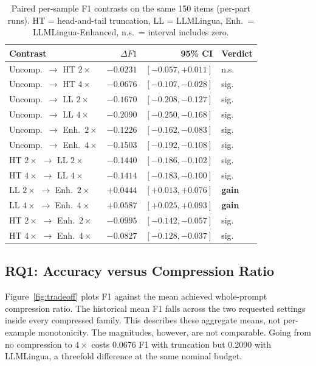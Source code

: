 \documentclass[10pt,a4paper,twocolumn]{article}
\begin{document}
\begin{table}[t]
\centering
\footnotesize
\setlength{\tabcolsep}{3pt}
\begin{tabular}{@{}lrrl@{}}
\toprule
Contrast & $\overline{\Delta F1}$ & 95\% CI & Verdict \\
\midrule
Uncomp.\ $\rightarrow$ HT $2\times$ & $-0.0231$ & $[-0.057,+0.011]$ & n.s. \\
Uncomp.\ $\rightarrow$ HT $4\times$ & $-0.0676$ & $[-0.107,-0.028]$ & sig. \\
Uncomp.\ $\rightarrow$ LL $2\times$ & $-0.1670$ & $[-0.208,-0.127]$ & sig. \\
Uncomp.\ $\rightarrow$ LL $4\times$ & $-0.2090$ & $[-0.250,-0.168]$ & sig. \\
Uncomp.\ $\rightarrow$ Enh.\ $2\times$ & $-0.1226$ & $[-0.162,-0.083]$ & sig. \\
Uncomp.\ $\rightarrow$ Enh.\ $4\times$ & $-0.1503$ & $[-0.192,-0.108]$ & sig. \\
HT $2\times$ $\rightarrow$ LL $2\times$ & $-0.1440$ & $[-0.186,-0.102]$ & sig. \\
HT $4\times$ $\rightarrow$ LL $4\times$ & $-0.1414$ & $[-0.183,-0.100]$ & sig. \\
LL $2\times$ $\rightarrow$ Enh.\ $2\times$ & $+0.0444$ & $[+0.013,+0.076]$ & \textbf{gain} \\
LL $4\times$ $\rightarrow$ Enh.\ $4\times$ & $+0.0587$ & $[+0.025,+0.093]$ & \textbf{gain} \\
HT $2\times$ $\rightarrow$ Enh.\ $2\times$ & $-0.0995$ & $[-0.142,-0.057]$ & sig. \\
HT $4\times$ $\rightarrow$ Enh.\ $4\times$ & $-0.0827$ & $[-0.128,-0.037]$ & sig. \\
\bottomrule
\end{tabular}
\caption{Paired per-sample F1 contrasts on the same 150 items (per-part runs).
HT = head-and-tail truncation, LL = LLMLingua, Enh.\ = LLMLingua-Enhanced,
n.s.\ = interval includes zero.}
\label{tab:paired}
\end{table}

\subsection{RQ1: Accuracy versus Compression Ratio}

Figure~\ref{fig:tradeoff} plots F1 against the mean achieved whole-prompt compression ratio. The
historical mean F1 falls across the two requested settings inside every compressed family. This describes these aggregate means, not per-example monotonicity. The magnitudes, however, are not comparable. Going from no
compression to $4\times$ costs 0.0676 F1 with truncation but 0.2090 with
LLMLingua, a threefold difference at the same nominal budget.
\end{document}
